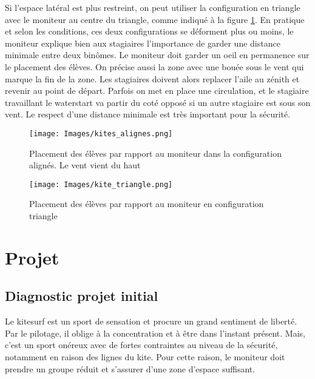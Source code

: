 \documentclass[11pt,a4paper]{report}
\begin{document}
Si l'espace latéral est plus restreint, on peut utiliser la configuration
en triangle avec le moniteur au centre du triangle, comme indiqué à la figure
\ref{kite_triangle}.
En pratique et selon les conditions, ces deux configurations se déforment plus ou moins, 
le moniteur explique bien aux stagiaires l'importance de garder une distance minimale 
entre deux binômes. Le moniteur doit garder un oeil en permanence sur le
placement des élèves. On précise aussi la zone avec une bouée sous le vent qui marque
la fin de la zone. Les stagiaires doivent alors replacer l'aile au zénith et 
revenir au point de départ. Parfois on met en place une circulation, 
et le stagiaire travaillant le waterstart va partir du coté opposé si 
un autre stagiaire est sous son  vent. Le respect d'une distance minimale est
très important pour la sécurité.


\begin{figure}
\begin{minipage}{0.4\textwidth}
\texttt{[image: Images/kites\_alignes.png]} 
\caption{Placement des élèves par rapport au moniteur dans la configuration
alignés\label{kites_alignes}. Le vent vient du haut}
\end{minipage}
\hfill
\begin{minipage}{0.4\textwidth}
\texttt{[image: Images/kite\_triangle.png]} 
\caption{Placement des élèves par rapport au moniteur en configuration
triangle\label{kite_triangle}}
\end{minipage}
\end{figure}






\FloatBarrier
\section{Projet}
\subsection{Diagnostic projet initial}

Le kitesurf est un sport de sensation et procure un grand
sentiment de liberté. Par le pilotage, il oblige à 
la concentration et à \^etre dans l'instant présent.
Mais, c'est un sport onéreux avec de fortes contraintes
au niveau de la sécurité, notamment en raison des lignes du kite.
Pour cette raison, le moniteur doit prendre un groupe réduit
et s'assurer d'une zone  d'espace suffisant. 
\end{document}
